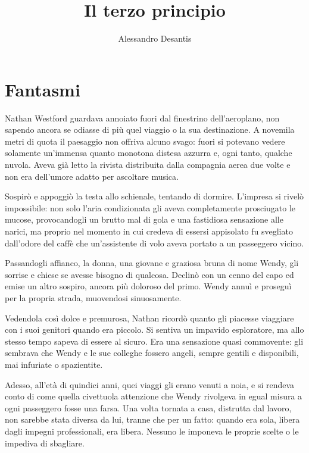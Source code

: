 \documentclass[a4paper,oneside,10pt]{memoir}
\title{Il terzo principio}
\author{Alessandro Desantis}
\date{}
\begin{document}
\begin{titlingpage}
\maketitle
\end{titlingpage}

\chapter{Fantasmi}

Nathan Westford guardava annoiato fuori dal finestrino dell'aeroplano, non sapendo ancora se odiasse di più quel
viaggio o la sua destinazione. A novemila metri di quota il paesaggio non offriva alcuno svago: fuori si potevano vedere
solamente un'immensa quanto monotona distesa azzurra e, ogni tanto, qualche nuvola. Aveva già letto la rivista
distribuita dalla compagnia aerea due volte e non era dell'umore adatto per ascoltare musica.

Sospirò e appoggiò la testa allo schienale, tentando di dormire. L'impresa si rivelò impossibile: non solo l'aria
condizionata gli aveva completamente prosciugato le mucose, provocandogli un brutto mal di gola e una fastidiosa
sensazione alle narici, ma proprio nel momento in cui credeva di essersi appisolato fu svegliato dall'odore del caffè
che un'assistente di volo aveva portato a un passeggero vicino.

Passandogli affianco, la donna, una giovane e graziosa bruna di nome Wendy, gli sorrise e chiese se avesse bisogno di
qualcosa. Declinò con un cenno del capo ed emise un altro sospiro, ancora più doloroso del primo. Wendy annuì e
proseguì per la propria strada, muovendosi sinuosamente.

Vedendola così dolce e premurosa, Nathan ricordò quanto gli piacesse viaggiare con i suoi genitori quando era piccolo.
Si sentiva un impavido esploratore, ma allo stesso tempo sapeva di essere al sicuro. Era una sensazione quasi
commovente: gli sembrava che Wendy e le sue colleghe fossero angeli, sempre gentili e disponibili, mai infuriate o
spazientite.

Adesso, all'età di quindici anni, quei viaggi gli erano venuti a noia, e si rendeva conto di come quella civettuola
attenzione che Wendy rivolgeva in egual misura a ogni passeggero fosse una farsa. Una volta tornata a casa, distrutta
dal lavoro, non sarebbe stata diversa da lui, tranne che per un fatto: quando era sola, libera dagli impegni
professionali, era libera. Nessuno le imponeva le proprie scelte o le impediva di sbagliare.
\end{document}
